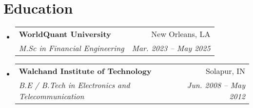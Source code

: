 \documentclass[letterpaper,11pt]{article}
\makeatletter
\newcommand{\resumeItem}[1]{
  \item\small{
    {#1 \vspace{-2pt}}
  }
}
\newcommand{\resumeSubheading}[4]{
  \vspace{-2pt}\item
    \begin{tabular*}{0.97\textwidth}[t]{l@{\extracolsep{\fill}}r}
      \textbf{#1} & #2 \\
      \textit{\small#3} & \textit{\small #4} \\
    \end{tabular*}\vspace{-7pt}
}
\newcommand{\resumeProjectHeading}[2]{
    \item
    \begin{tabular*}{0.97\textwidth}{l@{\extracolsep{\fill}}r}
      \small#1 & #2 \\
    \end{tabular*}\vspace{-7pt}
}
\newcommand{\resumeSubHeadingListStart}{\begin{itemize}[leftmargin=0.15in, label={}]}
\newcommand{\resumeSubHeadingListEnd}{\end{itemize}}
\newcommand{\resumeItemListStart}{\begin{itemize}}
\newcommand{\resumeItemListEnd}{\end{itemize}\vspace{-5pt}}
\makeatother
\begin{document}
\section{Education}
  \resumeSubHeadingListStart
    \resumeSubheading
      {WorldQuant University}{New Orleans, LA}
      {M.Sc in Financial Engineering}{Mar. 2023 -- May 2025}
    \resumeSubheading
      {Walchand Institute of Technology}{Solapur, IN}
      {B.E / B.Tech in Electronics and Telecommunication}{Jun. 2008 -- May 2012}
  \resumeSubHeadingListEnd


\end{document}
